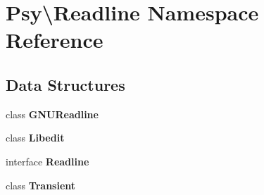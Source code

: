 \section{Psy\textbackslash{}Readline Namespace Reference}
\label{namespace_psy_1_1_readline}
\subsection*{Data Structures}
\begin{DoxyCompactItemize}
\item 
class {\bf G\+N\+U\+Readline}
\item 
class {\bf Libedit}
\item 
interface {\bf Readline}
\item 
class {\bf Transient}
\end{DoxyCompactItemize}
